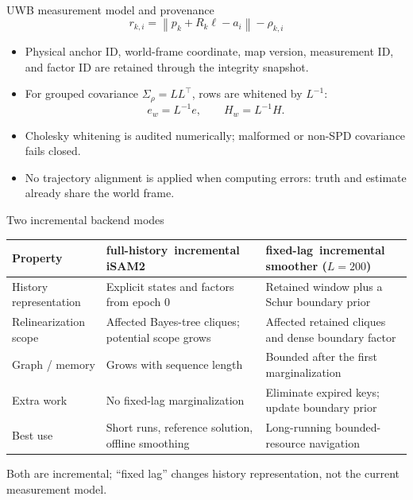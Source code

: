 \documentclass[aspectratio=169,10pt]{beamer}
\newcommand{\full}{\textcolor{FullBlue}{full-history}}
\newcommand{\lagged}{\textcolor{LagOrange}{fixed-lag}}
\begin{document}
\begin{frame}{UWB measurement model and provenance}
\[
r_{k,i}=\left\|p_k+R_k\ell-a_i\right\|-\rho_{k,i}
\]
\begin{itemize}
\item Physical anchor ID, world-frame coordinate, map version, measurement ID, and factor ID are retained through the integrity snapshot.
\item For grouped covariance $\Sigma_\rho=LL^\top$, rows are whitened by $L^{-1}$:
\[
e_w=L^{-1}e,\qquad H_w=L^{-1}H.
\]
\item Cholesky whitening is audited numerically; malformed or non-SPD covariance fails closed.
\item No trajectory alignment is applied when computing errors: truth and estimate already share the world frame.
\end{itemize}
\end{frame}

\begin{frame}{Two incremental backend modes}
\centering
{}
\vspace{.3em}
\scriptsize
\begin{tabular}{p{}p{}p{}}
\toprule
Property & \full\ incremental iSAM2 & \lagged\ incremental smoother ($L=200$)\\
\midrule
History representation & Explicit states and factors from epoch 0 & Retained window plus a Schur boundary prior\\
Relinearization scope & Affected Bayes-tree cliques; potential scope grows & Affected retained cliques and dense boundary factor\\
Graph / memory & Grows with sequence length & Bounded after the first marginalization\\
Extra work & No fixed-lag marginalization & Eliminate expired keys; update boundary prior\\
Best use & Short runs, reference solution, offline smoothing & Long-running bounded-resource navigation\\
\bottomrule
\end{tabular}
\vspace{.25em}

\small Both are incremental; ``fixed lag'' changes history representation, not the current measurement model.
\end{frame}
\end{document}
